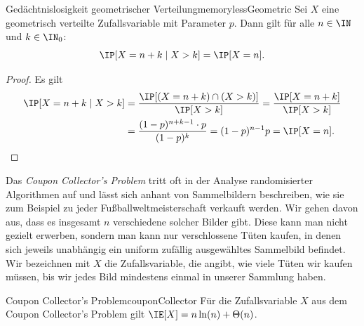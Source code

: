 \documentclass[language=ngerman,algolist]{TemplateLecture}
\begin{document}
\begin{lem}{Gedächtnislosigkeit geometrischer Verteilung}{memorylessGeometric}
    Sei $X$ eine geometrisch verteilte Zufallsvariable mit Parameter $p$. Dann gilt für alle $n \in \IN$ und $k \in \IN_0$:
    \begin{equation*}
        \IP[X = n + k \mid X > k] = \IP[X = n].
    \end{equation*}
\end{lem}
\begin{proof}
    Es gilt 
    \begin{equation*}
        \begin{split}
            \IP[X = n + k \mid X > k] &= \frac{\IP[(X = n + k) \cap (X > k)]}{\IP[X > k]} = \frac{\IP[X = n + k]}{\IP[X > k]} \\
            &= \frac{(1-p)^{n+k-1} \cdot p}{(1-p)^k} = (1-p)^{n-1} p = \IP[X = n].\qedhere
        \end{split}
    \end{equation*}
\end{proof}

Das \emph{Coupon Collector's Problem} tritt oft in der Analyse randomisierter Algorithmen auf und lässt sich anhant von Sammelbildern beschreiben, wie sie zum Beispiel zu jeder Fußballweltmeisterschaft verkauft werden. Wir gehen davon aus, dass es insgesamt $n$ verschiedene solcher Bilder gibt. Diese kann man nicht gezielt erwerben, sondern man kann nur verschlossene Tüten kaufen, in denen sich jeweils unabhängig ein uniform zufällig ausgewähltes Sammelbild befindet. Wir bezeichnen mit $X$ die Zufallsvariable, die angibt, wie viele Tüten wir kaufen müssen, bis wir jedes Bild mindestens einmal in unserer Sammlung haben.

\begin{thm}{Coupon Collector's Problem}{couponCollector}
    Für die Zufallsvariable $X$ aus dem Coupon Collector's Problem gilt $\IE[X] = n\ln(n) + \Theta(n)$.    
\end{thm}
\end{document}
